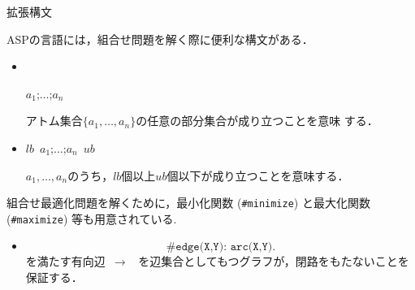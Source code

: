 \documentclass[dvipdfmx,10pt]{beamer}
\begin{document}
\begin{frame}{拡張構文}
\begin{alertblock}{}\centering
 ASPの言語には，組合せ問題を解く際に便利な構文がある． 
\end{alertblock}

\begin{itemize}
\item {}\\
  \begin{center}
   \code{\{}\(a_1\texttt{;}\dots\texttt{;}a_n\)\code{\}}\\
  \end{center}
  アトム集合\(\{a_1,\dots,a_n\}\)の任意の部分集合が成り立つことを意味
  する．
\item {}
  \begin{center}
   $lb$\ \code{\{}\(a_1\texttt{;}\dots\texttt{;}a_n\)\code{\}}\ $ub$
  \end{center}
  $a_1,\dots,a_n$のうち，$lb$個以上$ub$個以下が成り立つことを意味する．
\end{itemize}
\pause
組合せ最適化問題を解くために，最小化関数 (\texttt{\#minimize}) 
と最大化関数 (\texttt{\#maximize}) 等も用意されている.
\pause
\begin{itemize}
\item {}
  \[
      \texttt{\#edge(X,Y): 
      arc(X,Y)}.
  \]
  を満たす有向辺~$\rightarrow$~
  を辺集合としてもつグラフが，閉路をもたないことを保証する．
\end{itemize}
\end{frame}
\end{document}
